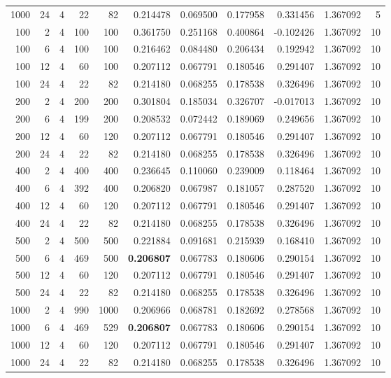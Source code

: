 \begin{table}
\begin{tabular}{rrrrrrrrrrr}
1000 & 24 & 4 & 22 & 82 & 0.214478 & 0.069500 & 0.177958 & 0.331456 & 1.367092 & 5 \\
100 & 2 & 4 & 100 & 100 & 0.361750 & 0.251168 & 0.400864 & -0.102426 & 1.367092 & 10 \\
100 & 6 & 4 & 100 & 100 & 0.216462 & 0.084480 & 0.206434 & 0.192942 & 1.367092 & 10 \\
100 & 12 & 4 & 60 & 100 & 0.207112 & 0.067791 & 0.180546 & 0.291407 & 1.367092 & 10 \\
100 & 24 & 4 & 22 & 82 & 0.214180 & 0.068255 & 0.178538 & 0.326496 & 1.367092 & 10 \\
200 & 2 & 4 & 200 & 200 & 0.301804 & 0.185034 & 0.326707 & -0.017013 & 1.367092 & 10 \\
200 & 6 & 4 & 199 & 200 & 0.208532 & 0.072442 & 0.189069 & 0.249656 & 1.367092 & 10 \\
200 & 12 & 4 & 60 & 120 & 0.207112 & 0.067791 & 0.180546 & 0.291407 & 1.367092 & 10 \\
200 & 24 & 4 & 22 & 82 & 0.214180 & 0.068255 & 0.178538 & 0.326496 & 1.367092 & 10 \\
400 & 2 & 4 & 400 & 400 & 0.236645 & 0.110060 & 0.239009 & 0.118464 & 1.367092 & 10 \\
400 & 6 & 4 & 392 & 400 & 0.206820 & 0.067987 & 0.181057 & 0.287520 & 1.367092 & 10 \\
400 & 12 & 4 & 60 & 120 & 0.207112 & 0.067791 & 0.180546 & 0.291407 & 1.367092 & 10 \\
400 & 24 & 4 & 22 & 82 & 0.214180 & 0.068255 & 0.178538 & 0.326496 & 1.367092 & 10 \\
500 & 2 & 4 & 500 & 500 & 0.221884 & 0.091681 & 0.215939 & 0.168410 & 1.367092 & 10 \\
500 & 6 & 4 & 469 & 500 & \textbf{0.206807} & 0.067783 & 0.180606 & 0.290154 & 1.367092 & 10 \\
500 & 12 & 4 & 60 & 120 & 0.207112 & 0.067791 & 0.180546 & 0.291407 & 1.367092 & 10 \\
500 & 24 & 4 & 22 & 82 & 0.214180 & 0.068255 & 0.178538 & 0.326496 & 1.367092 & 10 \\
1000 & 2 & 4 & 990 & 1000 & 0.206966 & 0.068781 & 0.182692 & 0.278568 & 1.367092 & 10 \\
1000 & 6 & 4 & 469 & 529 & \textbf{0.206807} & 0.067783 & 0.180606 & 0.290154 & 1.367092 & 10 \\
1000 & 12 & 4 & 60 & 120 & 0.207112 & 0.067791 & 0.180546 & 0.291407 & 1.367092 & 10 \\
1000 & 24 & 4 & 22 & 82 & 0.214180 & 0.068255 & 0.178538 & 0.326496 & 1.367092 & 10 \\

\end{tabular}
\end{table}
